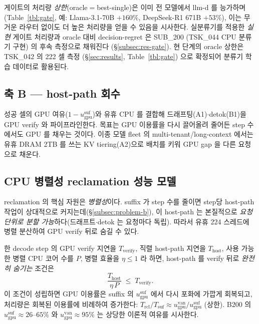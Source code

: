 게이트의 처리량 \emph{상한}(oracle$=$best-single)은 이미 전 모델에서 llm-d 를 능가하며
(Table~\ref{tbl:gate}, 예: Llama-3.1-70B $+160\%$, DeepSeek-R1 671B $+53\%$),
이는 무거운 라우터 없이도 더 높은 처리량을 얻을 수 있음을 시사한다.
실분류기를 적용한 \emph{실현} 게이트 처리량과 oracle 대비 decision-regret 은
SUB\_200 (TSK\_044 CPU 분류기 구현) 의 후속 측정으로 채워진다 (\S\ref{subsec:res-gate}).
현 단계의 oracle 상한은 TSK\_042 의 222 셀 측정 (\S\ref{sec:results}, Table~\ref{tbl:gate})
으로 확정되어 분류기 학습 데이터로 활용된다.

\subsection{축 B — host-path 회수}
\label{subsec:reclaim}

성공 셀의 GPU 여유($1-u_{\mathrm{gpu}}^{\mathrm{suf}}$)와 유휴 CPU 를 결합해
드래프팅(A1)$\cdot$detok(B1)을
GPU verify 와 파이프라인한다. 목표는 GPU 이용률을 다시 끌어올려
줄어든 step 수에서도 GPU 를 채우는 것이다.
이종 모델 fleet 의 multi-tenant/long-context 에서는 유휴 DRAM 2TB 를 쓰는
KV tiering(A2)으로 배치를 키워 GPU gap 을 다른 요청으로 채운다.

\subsection{CPU 병렬성 reclamation 성능 모델}
\label{subsec:parallel-model}

reclamation 의 핵심 자원은 \emph{병렬성}이다.
suffix 가 step 수를 줄이면 step당 host-path 작업이 상대적으로 커지는데(\S\ref{subsec:problem-b}),
이 host-path 는 본질적으로 \emph{요청 단위로 분할 가능}하다(드래프트$\cdot$detok 는
요청마다 독립). 따라서 유휴 224 스레드에 병렬 분산하여 GPU verify 뒤로 숨길 수 있다.

한 decode step 의 GPU verify 지연을 $T_{\mathrm{verify}}$, 직렬 host-path 지연을 $T_{\mathrm{host}}$,
사용 가능한 병렬 CPU 코어 수를 $P$, 병렬 효율을 $\eta\!\le\!1$ 라 하면,
host-path 를 verify 뒤로 \emph{완전히 숨기는} 조건은
\begin{equation}
\frac{T_{\mathrm{host}}}{\eta\,P} \;\le\; T_{\mathrm{verify}}.
\label{eq:hide-condition}
\end{equation}
이 조건이 성립하면 GPU 이용률은 suffix 의 $u_{\mathrm{gpu}}^{\mathrm{suf}}$ 에서
다시 포화에 가깝게 회복되고, 처리량은 회복된 이용률에 비례하여 증가한다:
$T_{\mathrm{rcl}} / T_{\mathrm{suf}} \approx u_{\mathrm{gpu}}^{\mathrm{van}} / u_{\mathrm{gpu}}^{\mathrm{suf}}$
(상한). B200 의 $u_{\mathrm{gpu}}^{\mathrm{suf}}\!\approx\!26\text{--}65\%$ 와
$u_{\mathrm{gpu}}^{\mathrm{van}}\!\approx\!95\%$ 는 상당한 이론적 여유를 시사한다.

